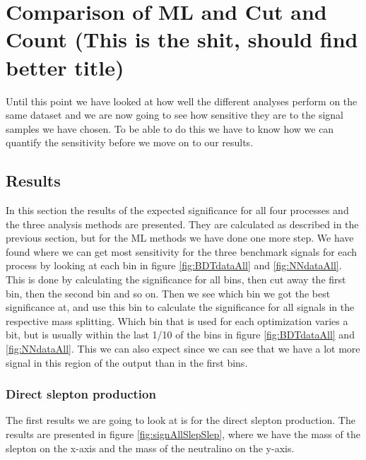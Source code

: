 \chapter{Comparison of ML and Cut and Count (This is the shit, should find better title)}
\label{sec:results}
Until this point we have looked at how well the different analyses perform on the same dataset and we are now going to see how sensitive they are to the signal samples we have chosen. To be able to do this we have to know how we can quantify the sensitivity before we move on to our results. 
%
%

%





\section{Results}
In this section the results of the expected significance for all four processes and the three analysis methods are presented. They are calculated as described in the previous section, but for the ML methods we have done one more step. We have found where we can get most sensitivity for the three benchmark signals for each process by looking at each bin in figure \ref{fig:BDTdataAll} and \ref{fig:NNdataAll}. This is done by calculating the significance for all bins, then cut away the first bin, then the second bin and so on. Then we see which bin we got the best significance at, and use this bin to calculate the significance for all signals in the respective mass splitting. Which bin that is used for each optimization varies a bit, but is usually within the last 1/10 of the bins in figure \ref{fig:BDTdataAll} and \ref{fig:NNdataAll}. This we can also expect since we can see that we have a lot more signal in this region of the output than in the first bins. 

\subsection{Direct slepton production}
\label{sec:resSlepSlep}
The first results we are going to look at is for the direct slepton production. The results are presented in figure \ref{fig:signAllSlepSlep}, where we have the mass of the slepton on the x-axis and the mass of the neutralino on the y-axis. 

